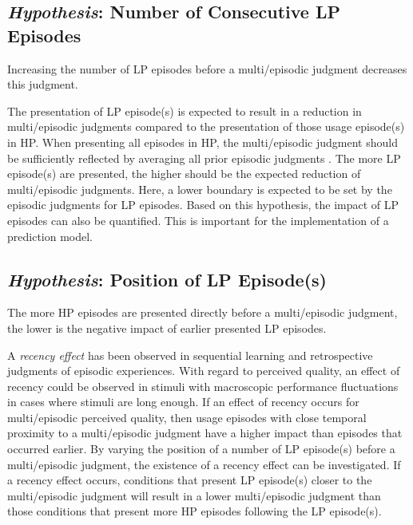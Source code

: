 \subsection[H1: Number of Consecutive \acs{LP} Episodes]{\emph{Hypothesis}: Number of Consecutive \acs{LP} Episodes}
\begin{hypothesis}\label{hypo:number}
Increasing the number of \ac{LP} episodes before a multi\-/episodic judgment decreases this judgment.
\end{hypothesis}

The presentation of \ac{LP} episode(s) is expected to result in a reduction in multi\-/episodic judgments compared to the presentation of those usage episode(s) in \ac{HP}.
When presenting all episodes in \ac{HP}, the multi\-/episodic judgment should be sufficiently reflected by averaging all prior episodic judgments \citep[\cf{}][]{moller_single-call_2011}.
The more \ac{LP} episode(s) are presented, the higher should be the expected reduction of multi\-/episodic judgments.
Here, a lower boundary is expected to be set by the episodic judgments for \ac{LP} episodes.
Based on this hypothesis, the impact of \ac{LP} episodes can also be quantified.
This is important for the implementation of a prediction model.


\subsection[H2: Position of \acs{LP} Episode(s)]{\emph{Hypothesis}: Position of \acs{LP} Episode(s)}
\begin{hypothesis}\label{hypo:position}
The more \ac{HP} episodes are presented directly before a multi\-/episodic judgment, the lower is the negative impact of earlier presented \ac{LP} episodes.
\end{hypothesis}

A \emph{recency effect} has been observed in sequential learning and retrospective judgments of episodic experiences.
With regard to perceived quality, an effect of recency could be observed in stimuli with macroscopic performance fluctuations in cases where stimuli are long enough.
If an effect of recency occurs for multi\-/episodic perceived quality, then usage episodes with close temporal proximity to a multi\-/episodic judgment have a higher impact than episodes that occurred earlier.
By varying the position of a number of \ac{LP} episode(s) before a multi\-/episodic judgment, the existence of a recency effect can be investigated.
If a recency effect occurs, conditions that present \ac{LP} episode(s) closer to the multi\-/episodic judgment will result in a lower multi\-/episodic judgment than those conditions that present more \ac{HP} episodes following the \ac{LP} episode(s).

